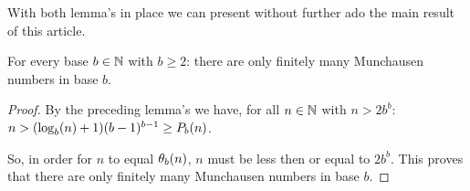 With both lemma's in place we can present without further ado the main result of
this article.

\begin{proposition}
	For every base $b \in \N$ with $b \ge 2$: there are only finitely many 
	Munchausen numbers in base $b$.
\end{proposition}

\begin{proof}
	By the preceding lemma's we have, for all $n \in \N$ with $n > 2b^{b}$: 
	$n > (\blog(n) + 1)(b-1)^{b-1} \ge P_{b}(n)$.
	
	So, in order for $n$ to equal $\P_{b}(n)$, $n$ must be less then or equal to 
	$2b^{b}$. This proves that there are only finitely many Munchausen numbers
	in base $b$.
\end{proof}
